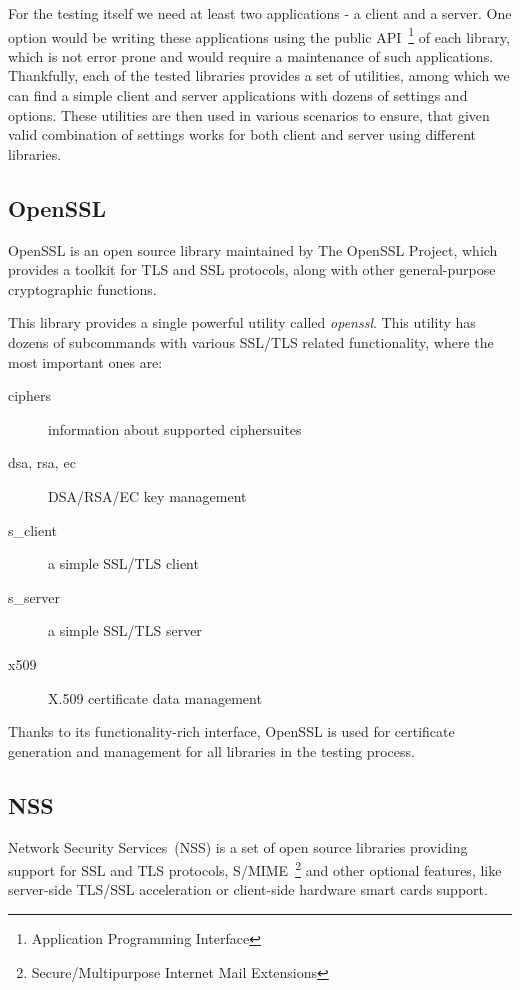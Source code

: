     For the testing itself we need at least two applications - a client and a server.
    One option would be writing these applications using the public
    API~\footnote{Application Programming Interface} of each library,
    which is not error prone and would require a maintenance of such applications.
    Thankfully, each of the tested libraries provides a set of utilities,
    among which we can find a simple client and server applications with
    dozens of settings and options. These utilities are then used in
    various scenarios to ensure, that given valid combination of settings works
    for both client and server using different libraries.

\subsection{OpenSSL}
    OpenSSL is an open source library maintained by The OpenSSL Project,
    which provides a toolkit for TLS and SSL
    protocols, along with other general-purpose cryptographic functions.

    This library provides a single powerful utility called \textit{openssl}. This
    utility has dozens of subcommands with various SSL/TLS related functionality,
    where the most important ones are:
    \begin{description}
        \item [ciphers] information about supported ciphersuites
        \item [dsa, rsa, ec] DSA/RSA/EC key management
        \item [s\_client] a simple SSL/TLS client
        \item [s\_server] a simple SSL/TLS server
        \item [x509] X.509 certificate data management
    \end{description}

    Thanks to its functionality-rich interface, OpenSSL is used for certificate
    generation and management for all libraries in the testing process.

\subsection{NSS}
    Network Security Services~(NSS) is a set of open source libraries providing
    support for SSL and TLS protocols,
    S/MIME~\footnote{Secure/Multipurpose Internet Mail Extensions}
    and other optional features, like
    server-side TLS/SSL acceleration or client-side hardware smart cards support.

